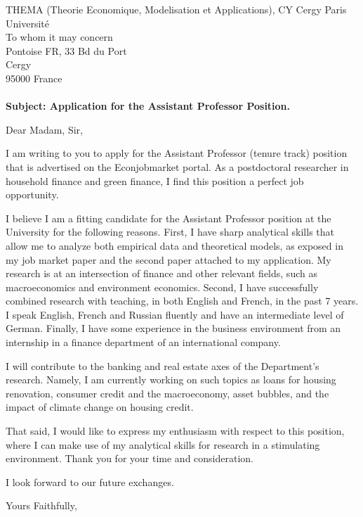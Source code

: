 \documentclass{letter}
\begin{document}
\begin{letter}{THEMA (Theorie Economique, Modelisation et Applications), CY Cergy Paris Université \\ To whom it may concern \\Pontoise FR, 33 Bd du Port \\Cergy\\95000 France\\
  ~ \\ \textbf{Subject: Application for the Assistant Professor Position.}}
\opening{Dear Madam, Sir,}

I am writing to you to apply for the Assistant Professor (tenure track) position that is advertised on the Econjobmarket portal. As a postdoctoral researcher in household finance and green finance, I find this position a perfect job opportunity. 

I believe I am a fitting candidate for the Assistant Professor position at the University for the following reasons. First, I have sharp analytical skills that allow me to analyze both empirical data and theoretical models, as exposed in my job market paper and the second paper attached to my application. My research is at an intersection of finance and other relevant fields, such as macroeconomics and environment economics. Second, I have successfully combined research with teaching, in both English and French, in the past 7 years. I speak English, French and Russian fluently and have an intermediate level of German. Finally, I have some experience in the business environment from an internship in a finance department of an international company. 

I will contribute to the banking and real estate axes of the Department's research. Namely, I am currently working on such topics as loans for housing renovation, consumer credit and the macroeconomy, asset bubbles, and the impact of climate change on housing credit. 

That said, I would like to express my enthusiasm with respect to this position, where I can make use of my analytical skills for research in a stimulating environment.  
Thank you for your time and consideration.

I look forward to our future exchanges.
\begin{flushright}
\closing{Yours Faithfully,}
\end{flushright}

\end{letter}
\end{document}
